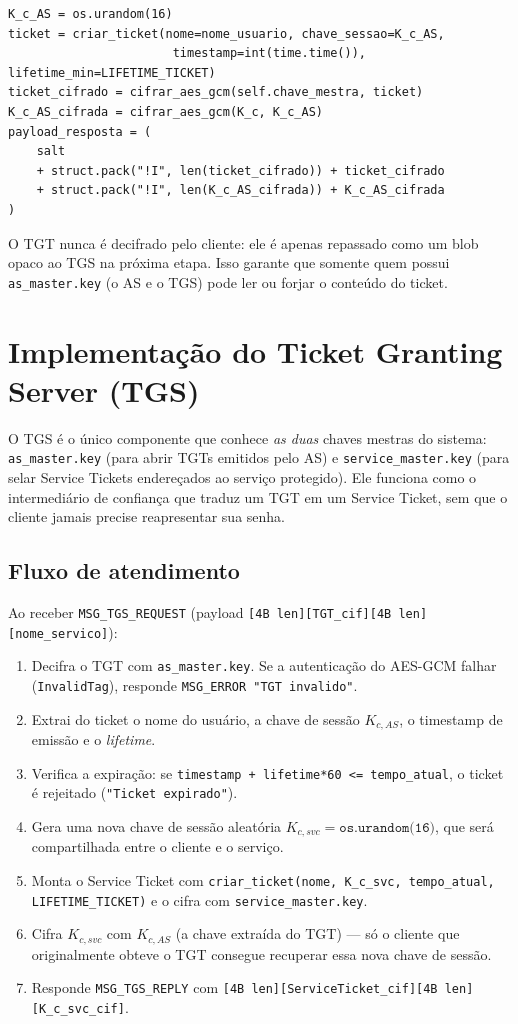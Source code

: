 \documentclass[11pt,a4paper]{article}
\begin{document}
\begin{lstlisting}
K_c_AS = os.urandom(16)
ticket = criar_ticket(nome=nome_usuario, chave_sessao=K_c_AS,
                       timestamp=int(time.time()), lifetime_min=LIFETIME_TICKET)
ticket_cifrado = cifrar_aes_gcm(self.chave_mestra, ticket)
K_c_AS_cifrada = cifrar_aes_gcm(K_c, K_c_AS)
payload_resposta = (
    salt
    + struct.pack("!I", len(ticket_cifrado)) + ticket_cifrado
    + struct.pack("!I", len(K_c_AS_cifrada)) + K_c_AS_cifrada
)
\end{lstlisting}

O TGT nunca é decifrado pelo cliente: ele é apenas repassado como um blob opaco ao TGS
na próxima etapa. Isso garante que somente quem possui \texttt{as\_master.key} (o AS e o
TGS) pode ler ou forjar o conteúdo do ticket.

\section{Implementação do Ticket Granting Server (TGS)}

O TGS é o único componente que conhece \emph{as duas} chaves mestras do sistema:
\texttt{as\_master.key} (para abrir TGTs emitidos pelo AS) e \texttt{service\_master.key}
(para selar Service Tickets endereçados ao serviço protegido). Ele funciona como o
intermediário de confiança que traduz um TGT em um Service Ticket, sem que o cliente
jamais precise reapresentar sua senha.

\subsection{Fluxo de atendimento}

Ao receber \texttt{MSG\_TGS\_REQUEST} (payload \texttt{[4B len][TGT\_cif][4B len][nome\_servico]}):

\begin{enumerate}
    \item Decifra o TGT com \texttt{as\_master.key}. Se a autenticação do AES-GCM falhar
    (\texttt{InvalidTag}), responde \texttt{MSG\_ERROR "TGT invalido"}.
    \item Extrai do ticket o nome do usuário, a chave de sessão $K_{c,AS}$, o timestamp de
    emissão e o \emph{lifetime}.
    \item Verifica a expiração: se \texttt{timestamp + lifetime*60 <= tempo\_atual}, o
    ticket é rejeitado (\texttt{"Ticket expirado"}).
    \item Gera uma nova chave de sessão aleatória $K_{c,svc} = \texttt{os.urandom(16)}$,
    que será compartilhada entre o cliente e o serviço.
    \item Monta o Service Ticket com \texttt{criar\_ticket(nome, K\_c\_svc, tempo\_atual,
    LIFETIME\_TICKET)} e o cifra com \texttt{service\_master.key}.
    \item Cifra $K_{c,svc}$ com $K_{c,AS}$ (a chave extraída do TGT) --- só o cliente que
    originalmente obteve o TGT consegue recuperar essa nova chave de sessão.
    \item Responde \texttt{MSG\_TGS\_REPLY} com
    \texttt{[4B len][ServiceTicket\_cif][4B len][K\_c\_svc\_cif]}.
\end{enumerate}
\end{document}
